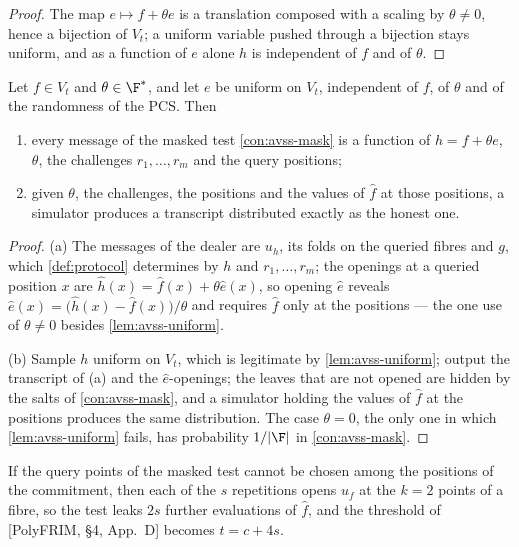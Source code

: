 {{\begin{proof}
The map $e\mapsto f+\theta e$ is a translation composed with a scaling by $\theta\ne0$, hence a
bijection of $V_t$; a uniform variable pushed through a bijection stays uniform, and as a function
of $e$ alone $h$ is independent of $f$ and of $\theta$.
\end{proof}

\begin{lemma}[Secrecy]\label{lem:avss-secret}\notready{}
Let $f\in V_t$ and $\theta\in\F^{*}$, and let $e$ be uniform on $V_t$, independent of $f$, of
$\theta$ and of the randomness of the PCS. Then
\begin{enumerate}
\item[(a)] every message of the masked test \ref{con:avss-mask} is a function of $h=f+\theta e$,
$\theta$, the challenges $r_1,\dots,r_m$ and the query positions;
\item[(b)] given $\theta$, the challenges, the positions and the values of $\hat f$ at those
positions, a simulator produces a transcript distributed exactly as the honest one.
\end{enumerate}
\end{lemma}

\begin{proof}
(a) The messages of the dealer are $u_h$, its folds on the queried fibres and $g$, which
\ref{def:protocol} determines by $h$ and $r_1,\dots,r_m$; the openings at a queried position $x$ are
$\hat h(x)=\hat f(x)+\theta\hat e(x)$, so opening $\hat e$ reveals
$\hat e(x)=\big(\hat h(x)-\hat f(x)\big)/\theta$ and requires $\hat f$ only at the positions --- the
one use of $\theta\ne0$ besides \ref{lem:avss-uniform}.

(b) Sample $h$ uniform on $V_t$, which is legitimate by \ref{lem:avss-uniform}; output the
transcript of (a) and the $\hat e$-openings; the leaves that are not opened are hidden by the salts
of \ref{con:avss-mask}, and a simulator holding the values of $\hat f$ at the positions produces the
same distribution. The case $\theta=0$, the only one in which \ref{lem:avss-uniform} fails, has
probability $1/|\F|$ in \ref{con:avss-mask}.
\end{proof}

\begin{remark}\label{rem:avss-leak}\notready{}
If the query points of the masked test cannot be chosen among the positions of the commitment,
then each of the $s$ repetitions opens $u_f$ at the $k=2$ points of a fibre, so the test leaks
$2s$ further evaluations of $\hat f$, and the threshold of {[PolyFRIM, \S4, App.~D]} becomes
$t=c+4s$.
\end{remark}

}}
